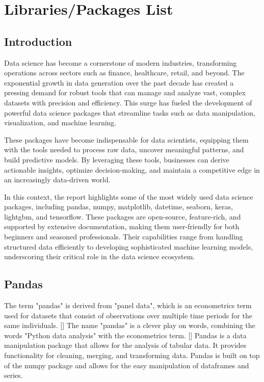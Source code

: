 %
%

\chapter{Libraries/Packages List}

	\section{Introduction}
	
	Data science has become a cornerstone of modern industries, transforming operations across sectors such as finance, healthcare, retail, and beyond. The exponential growth in data generation over the past decade has created a pressing demand for robust tools that can manage and analyze vast, complex datasets with precision and efficiency. This surge has fueled the development of powerful data science packages that streamline tasks such as data manipulation, visualization, and machine learning.
	
	These packages have become indispensable for data scientists, equipping them with the tools needed to process raw data, uncover meaningful patterns, and build predictive models. By leveraging these tools, businesses can derive actionable insights, optimize decision-making, and maintain a competitive edge in an increasingly data-driven world.
	
	In this context, the report highlights some of the most widely used data science packages, including pandas, numpy, matplotlib, datetime, seaborn, keras, lightgbm, and tensorflow. These packages are open-source, feature-rich, and supported by extensive documentation, making them user-friendly for both beginners and seasoned professionals. Their capabilities range from handling structured data efficiently to developing sophisticated machine learning models, underscoring their critical role in the data science ecosystem.
	
		\section{Pandas}
	
	The term "pandas" is derived from "panel data", which is an econometrics term used for datasets that consist of observations over multiple time periods for the same individuals. [\cite{McKinney:2011}] The name "pandas" is a clever play on words, combining the words "Python data analysis" with the econometrics term. [\cite{McKinney:2012}] Pandas is a data manipulation package that allows for the analysis of tabular data. It provides functionality for cleaning, merging, and transforming data. Pandas is built on top of the numpy package and allows for the easy manipulation of dataframes and series.
	
